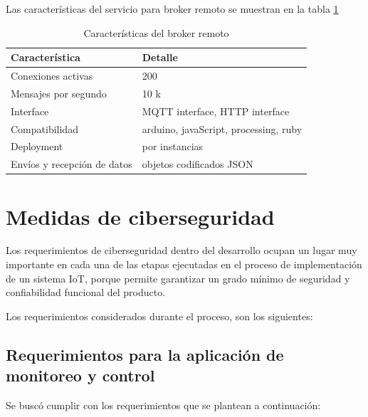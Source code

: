 Las características del servicio para broker remoto se muestran en la tabla  \ref{tab:brokerremoto}

\begin{table}[h]
	\centering
	\caption[Características del broker remoto]{Características del broker remoto}
	\begin{tabular}{p{5cm} p{7cm} }    
		\toprule
		\textbf{Característica} 	 & \textbf{Detalle}  \\
		\midrule
		Conexiones activas  & 200\\		
		Mensajes por segundo & 10 k \\
		Interface  & MQTT interface, HTTP interface\\		
		Compatibilidad & arduino, javaScript, processing, ruby \\		
		Deployment 	  & por instancias\\
		Envíos y recepción de datos & objetos codificados JSON\\
		
		\bottomrule
		\hline
	\end{tabular}
	\label{tab:brokerremoto}
\end{table}

\section{Medidas de ciberseguridad}

Los requerimientos de ciberseguridad dentro del desarrollo ocupan un lugar muy importante en cada una de las etapas ejecutadas en el proceso de implementación de un sistema IoT, porque permite garantizar un grado mínimo de seguridad y confiabilidad funcional del producto. 

Los requerimientos considerados durante el proceso, son los siguientes:

\subsection{Requerimientos para la aplicación de monitoreo y control}
Se buscó cumplir con los requerimientos que se plantean a continuación:

